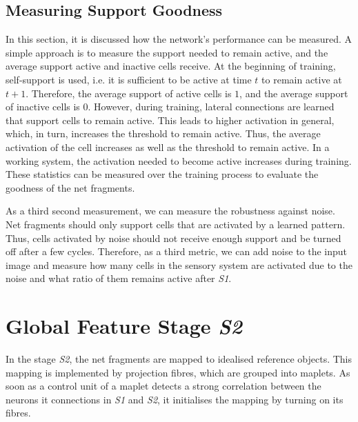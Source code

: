 \subsection{Measuring Support Goodness}
In this section, it is discussed how the network's performance can be measured.
A simple approach is to measure the support needed to remain active, and the average support active and inactive cells receive.
At the beginning of training, self-support is used, i.e. it is sufficient to be active at time $t$ to remain active at $t+1$.
Therefore, the average support of active cells is $1$, and the average support of inactive cells is $0$.
However, during training, lateral connections are learned that support cells to remain active.
This leads to higher activation in general, which, in turn, increases the threshold to remain active.
Thus, the average activation of the cell increases as well as the threshold to remain active.
In a working system, the activation needed to become active increases during training.
These statistics can be measured over the training process to evaluate the goodness of the net fragments.

As a third second measurement, we can measure the robustness against noise.
Net fragments should only support cells that are activated by a learned pattern. Thus, cells activated by noise should not receive enough support and be turned off after a few cycles.
Therefore, as a third metric, we can add noise to the input image and measure how many cells in the sensory system are activated due to the noise and what ratio of them remains active after \emph{S1}.































\section{Global Feature Stage \emph{S2}}
In the stage \emph{S2}, the net fragments are mapped to idealised reference objects.
This mapping is implemented by projection fibres, which are grouped into maplets.
As soon as a control unit of a maplet detects a strong correlation between the neurons it connections in \emph{S1} and \emph{S2}, it initialises the mapping by turning on its fibres.

